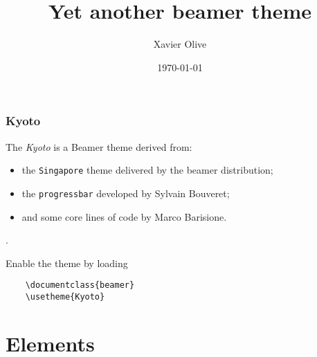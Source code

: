 \documentclass[10pt, compress]{beamer}
\title{Yet another beamer theme}
\subtitle{}
\date{\today}
\author{Xavier Olive}
\institute{Institute or miscellaneous information}
\begin{document}
\maketitle

\begin{frame}[fragile]
  \frametitle{Kyoto}

  The \emph{Kyoto} is a Beamer theme derived from:
  \begin{itemize}
      \item the \texttt{Singapore} theme delivered by the beamer distribution;
      \item the \texttt{progressbar} developed by Sylvain Bouveret;
      \item and some core lines of code by Marco Barisione.
  \end{itemize}.

  Enable the theme by loading

  \begin{verbatim}
    \documentclass{beamer}
    \usetheme{Kyoto}
  \end{verbatim}

\end{frame}

\section{Elements}
\end{document}
